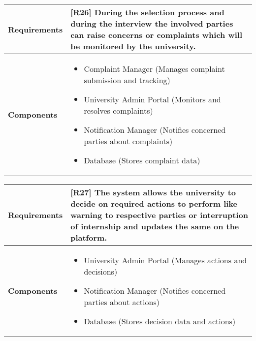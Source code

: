\begin{table}[h!]
\centering
\begin{tabular}{|l|p{10cm}|}
\hline
\textbf{Requirements} & 
[R26] During the selection process and during the interview the involved parties can raise concerns or complaints which will be monitored by the university.\\
\hline
\textbf{Components} & 
\begin{itemize}
    \item Complaint Manager (Manages complaint submission and tracking)
    \item University Admin Portal (Monitors and resolves complaints)
    \item Notification Manager (Notifies concerned parties about complaints)
    \item Database (Stores complaint data)
\end{itemize} \\
\hline
\end{tabular}
\label{tab:req_comp}
\end{table}

\begin{table}[h!]
\centering
\begin{tabular}{|l|p{10cm}|}
\hline
\textbf{Requirements} & 
[R27] The system allows the university to decide on required actions to perform like warning to respective parties or interruption of internship and updates the same on the platform.\\
\hline
\textbf{Components} & 
\begin{itemize}
    \item University Admin Portal (Manages actions and decisions)
    \item Notification Manager (Notifies concerned parties about actions)
    \item Database (Stores decision data and actions)
\end{itemize} \\
\hline
\end{tabular}
\label{tab:req_comp}
\end{table}











